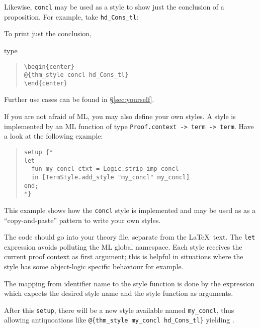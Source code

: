 \begin{isabellebody}
\begin{isamarkuptext}
  Likewise, \verb!concl! may be used as a style to show just the
  conclusion of a proposition. For example, take \verb!hd_Cons_tl!:
  \begin{center}
  \end{center}
  To print just the conclusion,
  \begin{center}
  \end{center}
  type
  \begin{quote}
    \verb!\begin{center}!\\
    \verb!@!\verb!{thm_style concl hd_Cons_tl}!\\
    \verb!\end{center}!
  \end{quote}

  Further use cases can be found in \S\ref{sec:yourself}.

  If you are not afraid of ML, you may also define your own styles.
  A style is implemented by an ML function of type
  \verb!Proof.context -> term -> term!.
  Have a look at the following example:%
\end{isamarkuptext}%
\isamarkuptrue%
\isamarkupfalse%
%
\begin{isamarkuptext}%
\begin{quote}
    \verb!setup {!\verb!*!\\
    \verb!let!\\
    \verb!  fun my_concl ctxt = Logic.strip_imp_concl!\\
    \verb!  in [TermStyle.add_style "my_concl" my_concl]!\\
    \verb!end;!\\
    \verb!*!\verb!}!\\
  \end{quote}

  \noindent
  This example shows how the \verb!concl! style is implemented
  and may be used as as a ``copy-and-paste'' pattern to write your own styles.

  The code should go into your theory file, separate from the \LaTeX\ text.
  The \verb!let! expression avoids polluting the
  ML global namespace. Each style receives the current proof context
  as first argument; this is helpful in situations where the
  style has some object-logic specific behaviour for example.

  The mapping from identifier name to the style function
  is done by the  expression which expects the desired
  style name and the style function as arguments.
  
  After this \verb!setup!,
  there will be a new style available named \verb!my_concl!, thus allowing
  antiquoations like \verb!@!\verb!{thm_style my_concl hd_Cons_tl}!
  yielding .%
\end{isamarkuptext}%
\isamarkuptrue%
\isamarkupfalse%
\end{isabellebody}%

